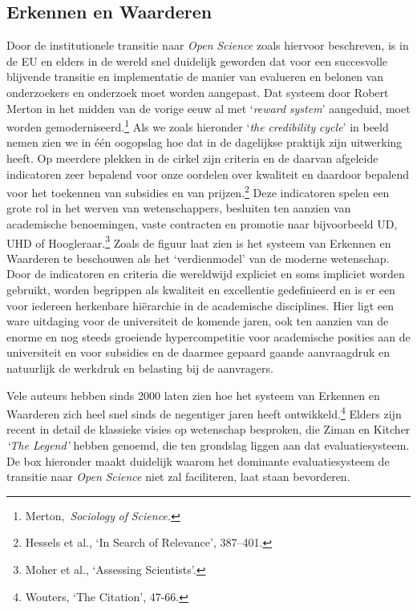 \documentclass[smallauthor, chapterhaspagenum, nochapterinheader, pagenuminheader,  bigchapnum,medium2, tocpages, garamond, titleinheader]{jote-book}
\begin{document}
	\subsection{Erkennen en Waarderen}



	Door de institutionele transitie naar \emph{Open }\emph{Science} zoals hiervoor beschreven, is in de EU en elders in de wereld snel duidelijk geworden dat voor een succesvolle blijvende transitie en implementatie de manier van evalueren en belonen van onderzoekers en onderzoek moet worden aangepast. Dat systeem door Robert Merton in het midden van de vorige eeuw al met ‘\emph{reward}\emph{ system}' aangeduid, moet worden gemoderniseerd.\footnote{Merton, \emph{Sociology}\emph{ of }\emph{Science}\emph{.}} Als we zoals hieronder ‘\emph{the}\emph{ }\emph{credibility}\emph{ }\emph{cycle}' in beeld nemen zien we in één oogopslag hoe dat in de dagelijkse praktijk zijn uitwerking heeft. Op meerdere plekken in de cirkel zijn criteria en de daarvan afgeleide indicatoren zeer bepalend voor onze oordelen over kwaliteit en daardoor bepalend voor het toekennen van subsidies en van prijzen.\footnote{Hessels et al., ‘In Search of Relevance', 387--401.} Deze indicatoren spelen een grote rol in het werven van wetenschappers, besluiten ten aanzien van academische benoemingen, vaste contracten en promotie naar bijvoorbeeld UD, UHD of Hoogleraar.\footnote{Moher et al., ‘Assessing Scientists'.} Zoals de figuur laat zien is het systeem van Erkennen en Waarderen te beschouwen als het ‘verdienmodel' van de moderne wetenschap. Door de indicatoren en criteria die wereldwijd expliciet en soms impliciet worden gebruikt, worden begrippen als kwaliteit en excellentie gedefinieerd en is er een voor iedereen herkenbare hiërarchie in de academische disciplines. Hier ligt een ware uitdaging voor de universiteit de komende jaren, ook ten aanzien van de enorme en nog steeds groeiende hypercompetitie voor academische posities aan de universiteit en voor subsidies en de daarmee gepaard gaande aanvraagdruk en natuurlijk de werkdruk en belasting bij de aanvragers.



	Vele auteurs hebben sinds 2000 laten zien hoe het systeem van Erkennen en Waarderen zich heel snel sinds de negentiger jaren heeft ontwikkeld.\footnote{Wouters, ‘The Citation', 47-66.} Elders zijn recent in detail de klassieke visies op wetenschap besproken, die Ziman en Kitcher \emph{‘The Legend'} hebben genoemd, die ten grondslag liggen aan dat evaluatiesysteem. De box hieronder maakt duidelijk waarom het dominante evaluatiesysteem de transitie naar \emph{Open }\emph{Science} niet zal faciliteren, laat staan bevorderen.
\end{document}
